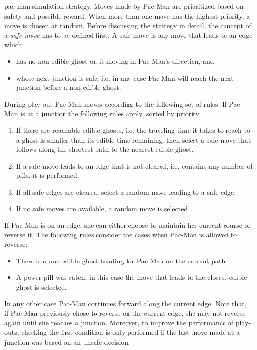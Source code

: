 \documentclass[journal]{IEEEtran}
\begin{document}
{\sc pac-man simulation strategy}. Moves made by Pac-Man are prioritized based on safety and possible reward. When more than one move has the highest priority, a move is chosen at random. Before discussing the strategy in detail, the concept of a \emph{safe move} has to be defined first. A safe move is any move that leads to an edge which:
\begin{itemize}
\item has no non-edible ghost on it moving in Pac-Man's direction, and
\item whose next junction is safe, i.e. in any case Pac-Man will reach the next junction before a non-edible ghost.
\end{itemize}

During play-out Pac-Man moves according to the following set of rules. If Pac-Man is at a junction the following rules apply, sorted by priority:
\begin{enumerate}
\item If there are reachable edible ghosts, i.e. the traveling time it takes to reach to a ghost is smaller than its edible time remaining, then select a safe move that follows along the shortest path to the nearest edible ghost.
\item If a safe move leads to an edge that is not cleared, i.e. contains any number of pills, it is performed.
\item If all safe edges are cleared, select a random move leading to a safe edge.
\item If no safe moves are available, a random move is selected \cite{ikehata2011monte}.
\end{enumerate}

If Pac-Man is on an edge, she can either choose to maintain her current course or reverse it. The following rules consider the cases when Pac-Man is allowed to reverse:
\begin{itemize}
\item There is a non-edible ghost heading for Pac-Man on the current path.
\item A power pill was eaten, in this case the move that leads to the closest edible ghost is selected.
\end{itemize}
In any other case Pac-Man continues forward along the current edge. Note that, if Pac-Man previously chose to reverse on the current edge, she may not reverse again until she reaches a junction. Moreover, to improve the performance of play-outs, checking the first condition is only performed if the last move made at a junction was based on an unsafe decision.
\end{document}
